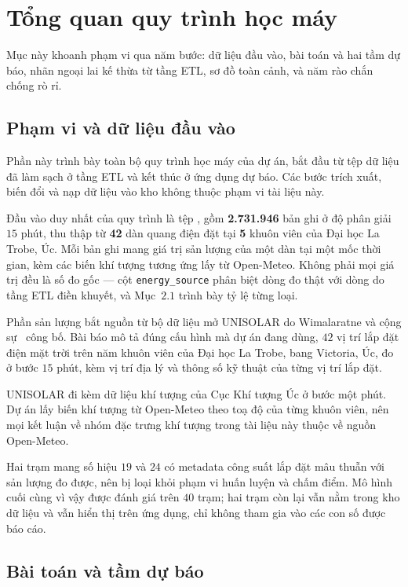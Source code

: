 \documentclass[12pt, a4paper]{report}
\begin{document}
\FloatBarrier
\section{Tổng quan quy trình học máy}

Mục này khoanh phạm vi qua năm bước: dữ liệu đầu vào, bài toán và hai tầm dự báo, nhãn
ngoại lai kế thừa từ tầng ETL, sơ đồ toàn cảnh, và năm rào chắn chống rò rỉ.

\FloatBarrier
\subsection{Phạm vi và dữ liệu đầu vào}

Phần này trình bày toàn bộ quy trình học máy của dự án, bắt đầu từ tệp dữ liệu đã
làm sạch ở tầng ETL và kết thúc ở ứng dụng dự báo. Các bước trích xuất, biến đổi và
nạp dữ liệu vào kho không thuộc phạm vi tài liệu này.

Đầu vào duy nhất của quy trình là tệp ,
gồm \textbf{2.731.946} bản ghi ở độ phân giải $15$ phút, thu thập từ \textbf{42} dàn
quang điện đặt tại \textbf{5} khuôn viên của Đại học La Trobe, Úc. Mỗi bản ghi mang
giá trị sản lượng của một dàn tại một mốc thời gian, kèm các biến khí tượng tương ứng lấy từ
Open-Meteo. Không phải mọi giá trị đều là số đo gốc --- cột \texttt{energy\_source} phân biệt dòng
đo thật với dòng do tầng ETL điền khuyết, và Mục~$2.1$ trình bày tỷ lệ từng loại.

Phần sản lượng bắt nguồn từ bộ dữ liệu mở UNISOLAR do Wimalaratne và cộng
sự~\cite{wimalaratne2022unisolar} công bố. Bài báo mô tả đúng cấu hình mà dự án đang
dùng, $42$ vị trí lắp đặt điện mặt trời trên năm khuôn viên của Đại học La Trobe, bang Victoria,
Úc, đo ở bước $15$ phút, kèm vị trí địa lý và thông số kỹ thuật của từng vị trí lắp đặt.

UNISOLAR đi kèm dữ liệu khí tượng của Cục Khí tượng Úc ở bước một phút. Dự án lấy biến
khí tượng từ Open-Meteo theo toạ độ của từng khuôn viên, nên mọi kết luận về
nhóm đặc trưng khí tượng trong tài liệu này thuộc về nguồn Open-Meteo.

Hai trạm mang số hiệu $19$ và $24$ có metadata công suất lắp đặt mâu thuẫn với
sản lượng đo được, nên bị loại khỏi phạm vi huấn luyện và chấm điểm. Mô hình cuối cùng
vì vậy được đánh giá trên $40$ trạm; hai trạm còn lại vẫn nằm trong kho dữ liệu và vẫn
hiển thị trên ứng dụng, chỉ không tham gia vào các con số được báo cáo.

\FloatBarrier
\subsection{Bài toán và tầm dự báo}
\end{document}
